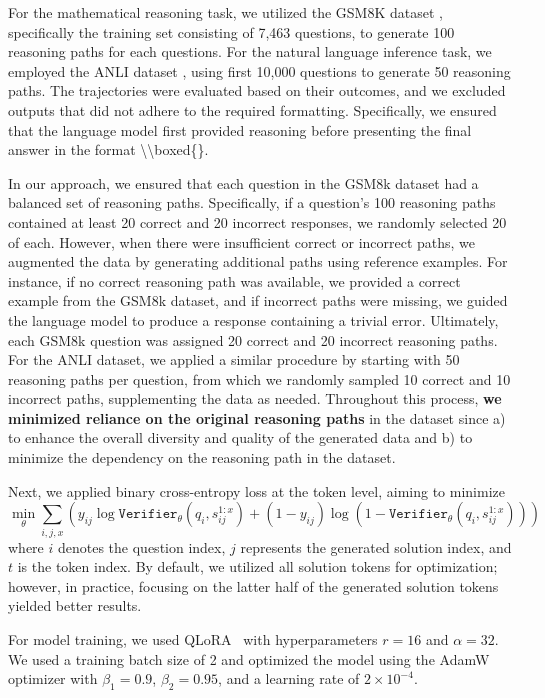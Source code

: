 For the mathematical reasoning task, we utilized the GSM8K dataset \citep{cobbe2021training}, specifically the training set consisting of 7,463 questions, to generate 100 reasoning paths for each questions. For the natural language inference task, we employed the ANLI dataset \citep{nie2019adversarial}, using first 10,000 questions to generate 50 reasoning paths. The trajectories were evaluated based on their outcomes, and we excluded outputs that did not adhere to the required formatting. Specifically, we ensured that the language model first provided reasoning before presenting the final answer in the format \textbackslash\textbackslash boxed\{\}.

In our approach, we ensured that each question in the GSM8k dataset had a balanced set of reasoning paths. Specifically, if a question’s 100 reasoning paths contained at least 20 correct and 20 incorrect responses, we randomly selected 20 of each. However, when there were insufficient correct or incorrect paths, we augmented the data by generating additional paths using reference examples. For instance, if no correct reasoning path was available, we provided a correct example from the GSM8k dataset, and if incorrect paths were missing, we guided the language model to produce a response containing a trivial error. Ultimately, each GSM8k question was assigned 20 correct and 20 incorrect reasoning paths. For the ANLI dataset, we applied a similar procedure by starting with 50 reasoning paths per question, from which we randomly sampled 10 correct and 10 incorrect paths, supplementing the data as needed. Throughout this process, \textbf{we minimized reliance on the original reasoning paths} in the dataset since a) to enhance the overall diversity and quality of the generated data and b) to minimize the dependency on the reasoning path in the dataset. 

Next, we applied binary cross-entropy loss at the token level, aiming to minimize  
\[
\min_{\theta} \sum_{i,j,x} \left( y_{ij} \log \texttt{Verifier}_{\theta}(q_i, s_{ij}^{1:x}) +  (1-y_{ij}) \log (1-\texttt{Verifier}_{\theta}(q_i, s_{ij}^{1:x})) \right)
\]
where \( i \) denotes the question index, \( j \) represents the generated solution index, and \( t \) is the token index. By default, we utilized all solution tokens for optimization; however, in practice, focusing on the latter half of the generated solution tokens yielded better results.

For model training, we used QLoRA~\citep{dettmers2024qlora} with hyperparameters \( r=16 \) and \( \alpha=32 \). We used a training batch size of 2 and optimized the model using the AdamW \citep{loshchilov2017decoupled} optimizer with \(\beta_1 = 0.9\), \(\beta_2 = 0.95\), and a learning rate of \( 2 \times 10^{-4} \).

